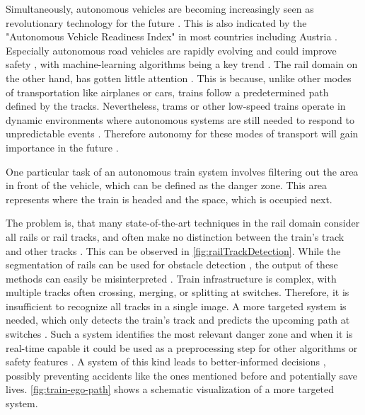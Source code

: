 \noindent Simultaneously, autonomous vehicles are becoming increasingly seen as revolutionary technology for the future \cite{FraunhoferInstituteforCognitiveSystemsIKS}.
This is also indicated by the "Autonomous Vehicle Readiness Index" \cite{autonomousVehicleReadinessIndex} in most countries including Austria \cite{autonomousVehicleReadinessCounties}.
Especially autonomous road vehicles are rapidly evolving and could improve safety \cite{railsem19dataset} \cite{tepNet2024}, with machine-learning algorithms being a key trend \cite{railsem19dataset}.
The rail domain on the other hand, has gotten little attention \cite{railsem19dataset}.
This is because, unlike other modes of transportation like airplanes or cars, trains follow a predetermined path defined by the tracks.
Nevertheless, trams or other low-speed trains operate in dynamic environments where autonomous systems are still needed to respond to unpredictable events \cite{tepNet2024}.
Therefore autonomy for these modes of transport will gain importance in the future \cite{railNet2019}.

One particular task of an autonomous train system involves filtering out the area in front of the vehicle, which can be defined as the danger zone.
This area represents where the train is headed and the space, which is occupied next.

The problem is, that many state-of-the-art techniques in the rail domain consider all rails or rail tracks, and often make no distinction between the train's track and other tracks \cite{tepNet2024}.
This can be observed in \autoref{fig:railTrackDetection}.
While the segmentation of rails can be used for obstacle detection \cite{railNet2019}, the output of these methods can easily be misinterpreted \cite{tepNet2024}.
Train infrastructure is complex, with multiple tracks often crossing, merging, or splitting at switches. Therefore, it is insufficient to recognize all tracks in a single image.
A more targeted system is needed, which only detects the train's track and predicts the upcoming path at switches \cite{tepNet2024}.
Such a system identifies the most relevant danger zone and when it is real-time capable it could be used as a preprocessing step for other algorithms or safety features \cite{tepNet2024} \cite{railNet2019}.
A system of this kind leads to better-informed decisions \cite{tepNet2024}, possibly preventing accidents like the ones mentioned before and potentially save lives.
\autoref{fig:train-ego-path} shows a schematic visualization of a more targeted system.

